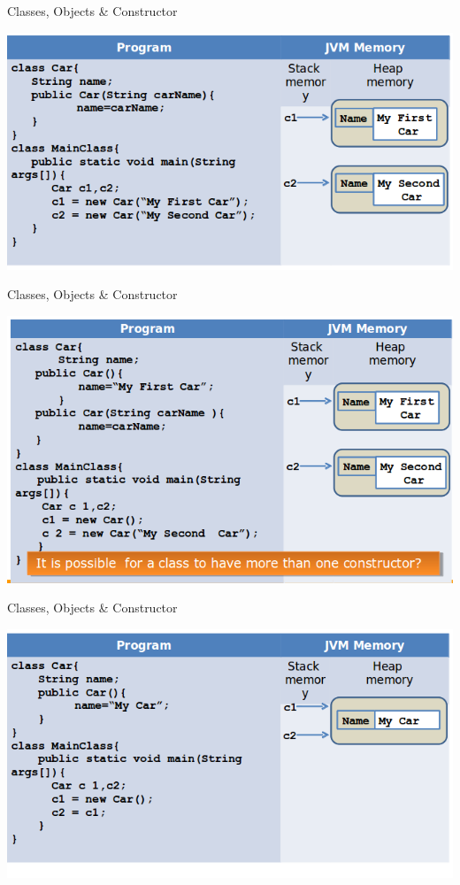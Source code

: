 \documentclass[14pt]{beamer}
\begin{document}
\begin{frame}[fragile]{Classes, Objects \& Constructor}
\begin{center}
  \includegraphics[scale=0.5]{COJ-M01-S03-Image20.png}
\end{center}
\end{frame}
\begin{frame}{Classes, Objects \& Constructor}
\begin{center}
  \includegraphics[scale=0.5]{COJ-M01-S03-Image21.png}
  \end{center}
  \end{frame}
\begin{frame}{Classes, Objects \& Constructor}

\begin{center}
            \includegraphics[scale=0.5]{COJ-M01-S03-Image22.png}
              \end{center}
                \end{frame}
\end{document}
